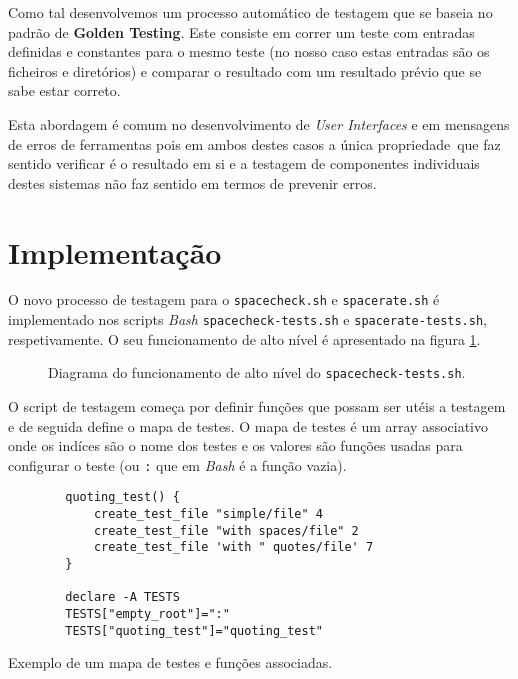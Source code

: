 Como tal desenvolvemos um processo automático de testagem que se baseia no
padrão de \textbf{Golden Testing}\cite{goldenTestsAreTasty}.
Este consiste em correr um teste com entradas
definidas e constantes para o mesmo teste (no nosso caso estas entradas são os
ficheiros e diretórios) e comparar o resultado com um resultado prévio que se
sabe estar correto.

Esta abordagem é comum no desenvolvimento de \emph{User Interfaces}
\cite{ebayScreenshotTesting} e em mensagens de erros de ferramentas
\cite{brsonRustTested} pois em ambos destes casos a única propriedade\ que faz
sentido verificar é o resultado em si e a testagem de componentes individuais
destes sistemas não faz sentido em termos de prevenir erros.

\section{Implementação}

O novo processo de testagem para o \Verb|spacecheck.sh| e \Verb|spacerate.sh|
é implementado nos scripts \emph{Bash} \Verb|spacecheck-tests.sh| e
\Verb|spacerate-tests.sh|, respetivamente. O seu funcionamento de alto nível é
apresentado na figura \ref{fig:testing_diagram}.

\begin{figure}[H]
	\centering
	\begin{tikzpicture}[node distance=2cm]
		
	\end{tikzpicture}
	\cprotect\caption{Diagrama do funcionamento de alto nível do \Verb|spacecheck-tests.sh|.}
	\label{fig:testing_diagram}
\end{figure}

\newpage

O script de testagem começa por definir funções que possam ser utéis a testagem
e de seguida define o mapa de testes. O mapa de testes é um array associativo
onde os indíces são o nome dos testes e os valores são funções usadas para
configurar o teste (ou \Verb|:| que em \emph{Bash} é a função vazia).


\begin{listing}[H]
	\centering
	\begin{verbatim}
		quoting_test() {
			create_test_file "simple/file" 4
			create_test_file "with spaces/file" 2
			create_test_file 'with " quotes/file' 7
		}

		declare -A TESTS
		TESTS["empty_root"]=":"
		TESTS["quoting_test"]="quoting_test"
	\end{verbatim}
	\cprotect\caption{Exemplo de um mapa de testes e funções associadas.}
\end{listing}

